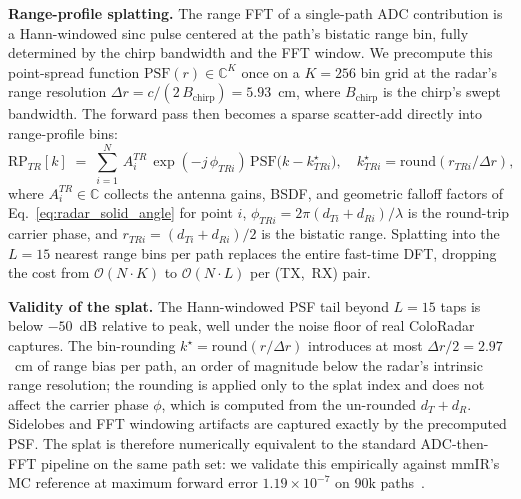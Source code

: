 \textbf{Range-profile splatting.} The range FFT of a single-path ADC contribution is a Hann-windowed sinc pulse centered at the path's bistatic range bin, fully determined by the chirp bandwidth and the FFT window. We precompute this point-spread function $\mathrm{PSF}(r) \in \mathbb{C}^K$ once on a $K{=}256$ bin grid at the radar's range resolution $\Delta r = c/(2\,B_{\text{chirp}}) = 5.93$~cm, where $B_{\text{chirp}}$ is the chirp's swept bandwidth. The forward pass then becomes a sparse scatter-add directly into range-profile bins:
\begin{equation}
\mathrm{RP}_{T R}[k]
\;=\;
\sum_{i=1}^{N}\,A_i^{T R}\,\exp(-j\,\phi_{T R i})\,
\mathrm{PSF}\!\bigl(k - k^{\star}_{T R i}\bigr),\quad
k^{\star}_{T R i} = \mathrm{round}(r_{T R i}/\Delta r),
\label{eq:psf_splat}
\end{equation}
where $A_i^{T R} \in \mathbb{C}$ collects the antenna gains, BSDF, and geometric falloff factors of Eq.~\eqref{eq:radar_solid_angle} for point $i$, $\phi_{T R i} = 2\pi(d_{T i}{+}d_{R i})/\lambda$ is the round-trip carrier phase, and $r_{T R i} = (d_{T i}{+}d_{R i})/2$ is the bistatic range. Splatting into the $L{=}15$ nearest range bins per path replaces the entire fast-time DFT, dropping the cost from $\mathcal{O}(N\!\cdot\!K)$ to $\mathcal{O}(N\!\cdot\!L)$ per (TX,~RX) pair.

\textbf{Validity of the splat.} The Hann-windowed PSF tail beyond $L{=}15$ taps is below $-50$~dB relative to peak, well under the noise floor of real ColoRadar captures. The bin-rounding $k^\star = \mathrm{round}(r/\Delta r)$ introduces at most $\Delta r/2 = 2.97$~cm of range bias per path, an order of magnitude below the radar's intrinsic range resolution; the rounding is applied only to the splat index and does not affect the carrier phase $\phi$, which is computed from the un-rounded $d_T+d_R$. Sidelobes and FFT windowing artifacts are captured exactly by the precomputed PSF. The splat is therefore numerically equivalent to the standard ADC-then-FFT pipeline on the same path set: we validate this empirically against mmIR's MC reference at maximum forward error $1.19\!\times\!10^{-7}$ on 90k paths~\cite{mmIR2026}.

